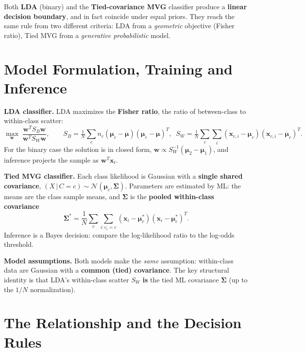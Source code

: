 Both \textbf{LDA} (binary) and the \textbf{Tied-covariance MVG} classifier produce a \textbf{linear decision boundary}, and in fact coincide under equal priors. They reach the same rule from two different criteria: LDA from a \emph{geometric} objective (Fisher ratio), Tied MVG from a \emph{generative probabilistic} model.

\bigskip
\section*{Model Formulation, Training and Inference}

\textbf{LDA classifier.} LDA maximizes the \textbf{Fisher ratio}, the ratio of between-class to within-class scatter:
\[
\max_{\mathbf{w}} \; \frac{\mathbf{w}^T S_B \mathbf{w}}{\mathbf{w}^T S_W \mathbf{w}}, \qquad S_B = \tfrac{1}{N}\!\sum_c n_c(\boldsymbol{\mu}_c-\boldsymbol{\mu})(\boldsymbol{\mu}_c-\boldsymbol{\mu})^T,\;\; S_W = \tfrac{1}{N}\!\sum_c\!\sum_i (\mathbf{x}_{c,i}-\boldsymbol{\mu}_c)(\mathbf{x}_{c,i}-\boldsymbol{\mu}_c)^T.
\]
For the binary case the solution is in closed form, $\mathbf{w} \propto S_W^{-1}(\boldsymbol{\mu}_2-\boldsymbol{\mu}_1)$, and inference projects the sample as $\mathbf{w}^T\mathbf{x}_t$.

\textbf{Tied MVG classifier.} Each class likelihood is Gaussian with a \textbf{single shared covariance}, $(X\,|\,C=c)\sim\mathcal{N}(\boldsymbol{\mu}_c,\boldsymbol{\Sigma})$. Parameters are estimated by ML: the means are the class sample means, and $\boldsymbol{\Sigma}$ is the \textbf{pooled within-class covariance}
\[
\boldsymbol{\Sigma}^* = \frac{1}{N}\sum_c \sum_{i:c_i=c}(\mathbf{x}_i-\boldsymbol{\mu}_c^*)(\mathbf{x}_i-\boldsymbol{\mu}_c^*)^T.
\]
Inference is a Bayes decision: compare the log-likelihood ratio to the log-odds threshold.

\textbf{Model assumptions.} Both models make the \emph{same} assumption: within-class data are Gaussian with a \textbf{common (tied) covariance}. The key structural identity is that LDA's within-class scatter $S_W$ \textbf{is} the tied ML covariance $\boldsymbol{\Sigma}$ (up to the $1/N$ normalization).

\bigskip
\section*{The Relationship and the Decision Rules}

